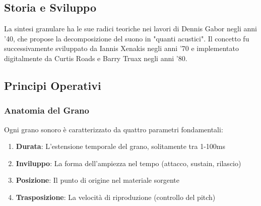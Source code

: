 \documentclass[a4paper,11pt,openany]{book}
\begin{document}
\subsection{Storia e Sviluppo}

La sintesi granulare ha le sue radici teoriche nei lavori di Dennis Gabor negli anni '40, che propose la decomposizione del suono in "quanti acustici". Il concetto fu successivamente sviluppato da Iannis Xenakis negli anni '70 e implementato digitalmente da Curtis Roads e Barry Truax negli anni '80.

\subsection{Principi Operativi}

\subsubsection{Anatomia del Grano}

Ogni grano sonoro è caratterizzato da quattro parametri fondamentali:

\begin{enumerate}
    \item \textbf{Durata}: L'estensione temporale del grano, solitamente tra 1-100ms
    \item \textbf{Inviluppo}: La forma dell'ampiezza nel tempo (attacco, sustain, rilascio)
    \item \textbf{Posizione}: Il punto di origine nel materiale sorgente
    \item \textbf{Trasposizione}: La velocità di riproduzione (controllo del pitch)
\end{enumerate}
\end{document}
